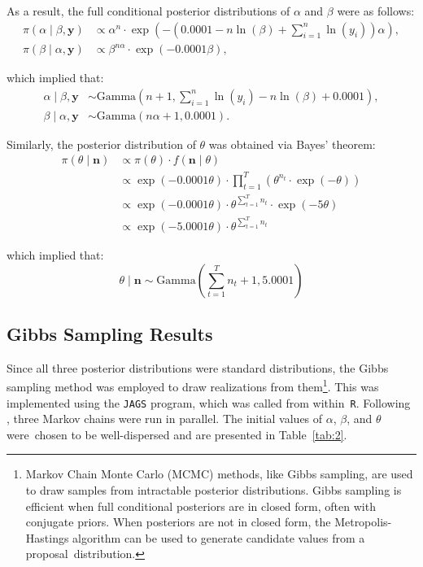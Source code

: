 \documentclass{Class/julia}
\begin{document}
\noindent As a result, the full conditional posterior distributions of \( \alpha \) and \( \beta \) were as follows:
\begin{align*}
\pi(\alpha \mid \beta, \mathbf{y}) &\propto \alpha^n \cdot \exp\left( - \left( 0.0001 - n \ln(\beta) + \sum_{i=1}^{n} \ln(y_i) \right) \alpha \right), \\
\pi(\beta \mid \alpha, \mathbf{y}) &\propto \beta^{n \alpha} \cdot \exp(-0.0001 \beta),
\end{align*}

\noindent which implied that:
\begin{align*}
\alpha \mid \beta, \mathbf{y} &\sim \text{Gamma}\left(n+1, \sum_{i=1}^{n} \ln(y_i) - n \ln(\beta) + 0.0001\right), \\
\beta \mid \alpha, \mathbf{y} &\sim \text{Gamma}(n \alpha + 1, 0.0001).
\end{align*}

Similarly, the posterior distribution of \( \theta \) was obtained via Bayes' theorem:
\begin{align*}
\pi(\theta \mid \mathbf{n}) &\propto \pi(\theta) \cdot f(\mathbf{n} \mid \theta) \\
&\propto \exp(-0.0001 \theta) \cdot \prod_{t=1}^{T} \left( \theta^{n_t} \cdot \exp(-\theta) \right) \\
&\propto \exp(-0.0001 \theta) \cdot \theta^{\sum_{t=1}^{T} n_t} \cdot \exp(-5 \theta) \\
&\propto \exp(-5.0001 \theta) \cdot \theta^{\sum_{t=1}^{T} n_t}
\end{align*}

\noindent which implied that:
\[
\theta \mid \mathbf{n} \sim \text{Gamma}\left( \sum_{t=1}^{T} n_t + 1, 5.0001 \right)
\]

\subsection{Gibbs Sampling Results}

Since all three posterior distributions were standard distributions, the Gibbs sampling method was employed to draw realizations from them\footnote{Markov Chain Monte Carlo (MCMC) methods, like Gibbs sampling, are used to draw samples from intractable posterior distributions. Gibbs sampling is efficient when full conditional posteriors are in closed form, often with conjugate priors. When posteriors are not in closed form, the Metropolis-Hastings algorithm can be used to generate candidate values from a proposal~distribution.}. This was implemented using the \texttt{JAGS} program, which was called from within~\texttt{R}. Following \citet{dudley2006bayesian}, three Markov chains were run in parallel. The initial values of \( \alpha \), \( \beta \), and \( \theta \) were~chosen to be well-dispersed and are presented in Table~\ref{tab:2}.
\end{document}
